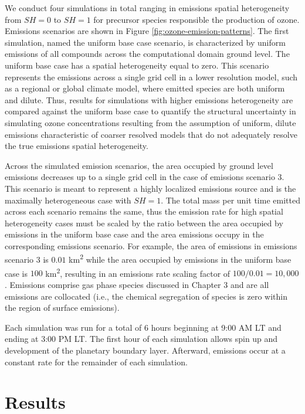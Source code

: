 We conduct four simulations in total ranging in emissions spatial heterogeneity from $SH=0$ to $SH=1$ for precursor species responsible the production of ozone. Emissions scenarios are shown in Figure \ref{fig:ozone-emission-patterns}. The first simulation, named the uniform base case scenario, is characterized by uniform emissions of all compounds across the computational domain ground level. The uniform base case has a spatial heterogeneity equal to zero. This scenario represents the emissions across a single grid cell in a lower resolution model, such as a regional or global climate model, where emitted species are both uniform and dilute. Thus, results for simulations with higher emissions heterogeneity are compared against the uniform base case to quantify the structural uncertainty in simulating ozone concentrations resulting from the assumption of uniform, dilute emissions characteristic of coarser resolved models that do not adequately resolve the true emissions spatial heterogeneity.  

Across the simulated emission scenarios, the area occupied by ground level emissions decreases up to a single grid cell in the case of emissions scenario 3. This scenario is meant to represent a highly localized emissions source and is the maximally heterogeneous case with $SH=1$. The total mass per unit time emitted across each scenario remains the same, thus the emission rate for high spatial heterogeneity cases must be scaled by the ratio between the area occupied by emissions in the uniform base case and the area emissions occupy in the corresponding emissions scenario. For example, the area of emissions in emissions scenario 3 is $0.01$ \si{km^2} while the area occupied by emissions in the uniform base case is  $100$ \si{km^2}, resulting in an emissions rate scaling factor of $100/0.01 = 10,000$. Emissions comprise gas phase species discussed in Chapter 3 and are all emissions are collocated (i.e., the chemical segregation of species is zero within the region of surface emissions). 

Each simulation was run for a total of 6 hours beginning at 9:00 AM LT and ending at 3:00 PM LT. The first hour of each simulation allows spin up and development of the planetary boundary layer. Afterward, emissions occur at a constant rate for the remainder of each simulation.

\section{Results}

